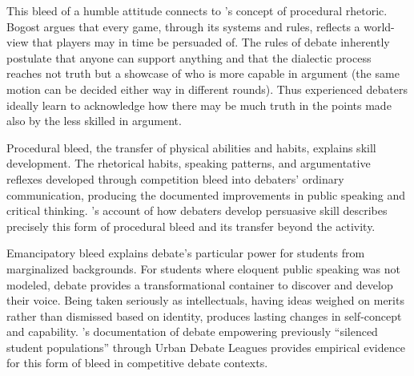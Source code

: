 \documentclass[12pt]{article}
\begin{document}
This bleed of a humble attitude connects to \textcite{bogost2007persuasive}'s concept of procedural rhetoric. Bogost argues that every game, through its systems and rules, reflects a world-view that players may in time be persuaded of. The rules of debate inherently postulate that anyone can support anything and that the dialectic process reaches not truth but a showcase of who is more capable in argument (the same motion can be decided either way in different rounds). Thus experienced debaters ideally learn to acknowledge how there may be much truth in the points made also by the less skilled in argument.

Procedural bleed, the transfer of physical abilities and habits, explains skill development. The rhetorical habits, speaking patterns, and argumentative reflexes developed through competition bleed into debaters' ordinary communication, producing the documented improvements in public speaking and critical thinking. \textcite{cirlin1997sociological}'s account of how debaters develop persuasive skill describes precisely this form of procedural bleed and its transfer beyond the activity.

Emancipatory bleed \parencite{kemper2017battle,kemper2020wyrding} explains debate's particular power for students from marginalized backgrounds. For students where eloquent public speaking was not modeled, debate provides a transformational container \parencite{bowman2021magic} to discover and develop their voice. Being taken seriously as intellectuals, having ideas weighed on merits rather than dismissed based on identity, produces lasting changes in self-concept and capability. \textcite{snider2003gamemaster}'s documentation of debate empowering previously ``silenced student populations'' through Urban Debate Leagues provides empirical evidence for this form of bleed in competitive debate contexts.


\end{document}
